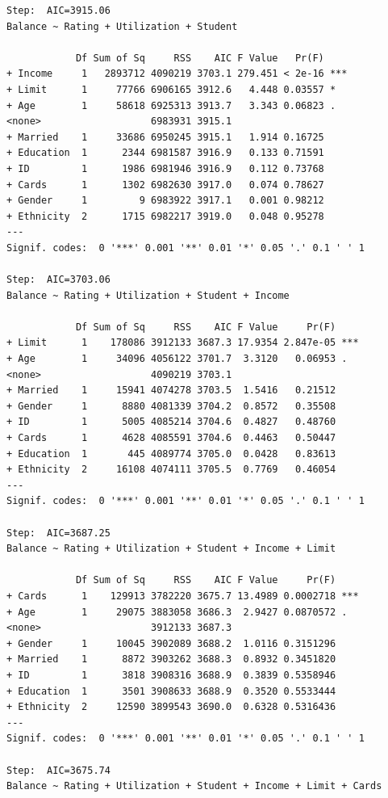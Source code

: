 \documentclass[
]{article}
\begin{document}
\begin{verbatim}
Step:  AIC=3915.06
Balance ~ Rating + Utilization + Student

            Df Sum of Sq     RSS    AIC F Value   Pr(F)    
+ Income     1   2893712 4090219 3703.1 279.451 < 2e-16 ***
+ Limit      1     77766 6906165 3912.6   4.448 0.03557 *  
+ Age        1     58618 6925313 3913.7   3.343 0.06823 .  
<none>                   6983931 3915.1                    
+ Married    1     33686 6950245 3915.1   1.914 0.16725    
+ Education  1      2344 6981587 3916.9   0.133 0.71591    
+ ID         1      1986 6981946 3916.9   0.112 0.73768    
+ Cards      1      1302 6982630 3917.0   0.074 0.78627    
+ Gender     1         9 6983922 3917.1   0.001 0.98212    
+ Ethnicity  2      1715 6982217 3919.0   0.048 0.95278    
---
Signif. codes:  0 '***' 0.001 '**' 0.01 '*' 0.05 '.' 0.1 ' ' 1

Step:  AIC=3703.06
Balance ~ Rating + Utilization + Student + Income

            Df Sum of Sq     RSS    AIC F Value     Pr(F)    
+ Limit      1    178086 3912133 3687.3 17.9354 2.847e-05 ***
+ Age        1     34096 4056122 3701.7  3.3120   0.06953 .  
<none>                   4090219 3703.1                      
+ Married    1     15941 4074278 3703.5  1.5416   0.21512    
+ Gender     1      8880 4081339 3704.2  0.8572   0.35508    
+ ID         1      5005 4085214 3704.6  0.4827   0.48760    
+ Cards      1      4628 4085591 3704.6  0.4463   0.50447    
+ Education  1       445 4089774 3705.0  0.0428   0.83613    
+ Ethnicity  2     16108 4074111 3705.5  0.7769   0.46054    
---
Signif. codes:  0 '***' 0.001 '**' 0.01 '*' 0.05 '.' 0.1 ' ' 1

Step:  AIC=3687.25
Balance ~ Rating + Utilization + Student + Income + Limit

            Df Sum of Sq     RSS    AIC F Value     Pr(F)    
+ Cards      1    129913 3782220 3675.7 13.4989 0.0002718 ***
+ Age        1     29075 3883058 3686.3  2.9427 0.0870572 .  
<none>                   3912133 3687.3                      
+ Gender     1     10045 3902089 3688.2  1.0116 0.3151296    
+ Married    1      8872 3903262 3688.3  0.8932 0.3451820    
+ ID         1      3818 3908316 3688.9  0.3839 0.5358946    
+ Education  1      3501 3908633 3688.9  0.3520 0.5533444    
+ Ethnicity  2     12590 3899543 3690.0  0.6328 0.5316436    
---
Signif. codes:  0 '***' 0.001 '**' 0.01 '*' 0.05 '.' 0.1 ' ' 1

Step:  AIC=3675.74
Balance ~ Rating + Utilization + Student + Income + Limit + Cards


\end{verbatim}
\end{document}
